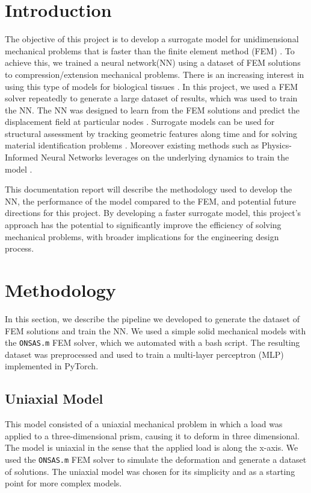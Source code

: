 \documentclass[oneside,a4paper,english,links]{amca}
\begin{document}
\section{Introduction}
The objective of this project is to develop a surrogate model for unidimensional mechanical problems that is faster than the finite element method (FEM) \citep{martinez2017finite, bohringer2023strategy}. To achieve this, we trained a neural network(NN) using a dataset of FEM solutions to compression/extension mechanical problems. 
%
There is an increasing interest in using this type of models for biological tissues \citep{pellicer2020real}. In this project, we used a FEM solver repeatedly to generate a large dataset of results, which was used to train the NN. 
%
The NN was designed to learn from the FEM solutions and predict the displacement field at particular nodes \cite{yang2022tracker}. Surrogate models can be used for structural assessment by tracking geometric features along time \cite{zhu2023visual} and for solving material identification problems \cite{steuben2015inverse}.
%
Moreover existing methods such as Physics-Informed Neural Networks leverages on the underlying dynamics to train the model \citep{raissi2017physics}. 

This documentation report will describe the methodology used to develop the NN, the performance of the model compared to the FEM, and potential future directions for this project. By developing a faster surrogate model, this project's approach has the potential to significantly improve the efficiency of solving mechanical problems, with broader implications for the engineering design process.

\section{Methodology}
In this section, we describe the pipeline we developed to generate the dataset of FEM solutions and train the NN. We used a simple solid mechanical models with the \texttt{ONSAS.m} FEM solver, which we automated with a bash script. The resulting dataset was preprocessed and used to train a multi-layer perceptron (MLP) implemented in PyTorch.

\subsection{Uniaxial Model}
This model consisted of a uniaxial mechanical problem in which a load was applied to a three-dimensional prism, causing it to deform in three dimensional. The model is uniaxial in the sense that the applied load is along the x-axis. We used the \texttt{ONSAS.m} FEM solver to simulate the deformation and generate a dataset of solutions. The uniaxial model was chosen for its simplicity and as a starting point for more complex models.
\end{document}

